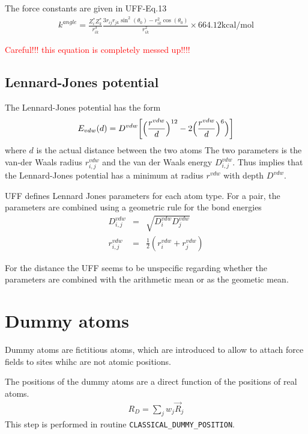 \documentclass[11pt,a4paper]{report}
\begin{document}
The force constants are given in UFF-Eq.13
\begin{eqnarray}
k^{angle}= \frac{Z^*_iZ^*_k}{r_{ik}^3}
\frac{3r_{ij}r_{jk}\sin^2(\theta_0)
-r_{ik}^2\cos(\theta_0)}{r_{ik}^2}
\times 664.12 \text{kcal/mol}
\end{eqnarray}

\textcolor{red}{Careful!!! this equation is completely messed up!!!!}

\subsection{Lennard-Jones potential}
The Lennard-Jones potential has the form 
\begin{eqnarray}
E_{vdw}(d)=D^{vdw}\biggl[\Bigl(\frac{r^{vdw}}{d}\Bigr)^{12}-2
\Bigl(\frac{r^{vdw}}{d}\Bigr)^{6}\Bigr)\biggr]
\end{eqnarray}
where $d$ is the actual distance between the two atoms The two
parameters is the van-der Waals radius $r^{vdw}_{i,j}$ and the van der
Waals energy $D^{vdw}_{i,j}$.  Thus implies that the Lennard-Jones
potential has a minimum at radius $r^{vdw}$ with depth $D^{vdw}$.

UFF defines Lennard Jones parameters for each atom type. For a pair,
the parameters are combined using a geometric rule for the bond energies
\begin{eqnarray}
D^{vdw}_{i,j}&=&\sqrt{D^{vdw}_{i}D^{vdw}_{j}}
\\
r^{vdw}_{i,j}&=&\frac{1}{2}\left(r^{vdw}_i+r^{vdw}_j\right)
\end{eqnarray}

For the distance the UFF seems to be unspecific regarding whether the
parameters are combined with the arithmetic mean or as the geometic
mean.



\section{Dummy atoms}
Dummy atoms are fictitious atoms, which are introduced to allow to
attach force fields to sites whihc are not atomic positions.

The positions of the dummy atoms are a direct function of the
positions of real atoms.
\begin{eqnarray}
R_D=\sum_j w_j \vec{R}_j
\end{eqnarray}
This step is performed in routine \verb|CLASSICAL_DUMMY_POSITION|.
\end{document}

